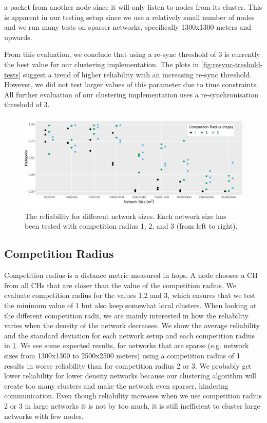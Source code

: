 a packet from another node since it will only listen to nodes from its cluster. This is apparent in our testing setup since we use a relatively small number of nodes and we run many tests on sparser networks, specifically 1300x1300 meters and upwards. 

From this evaluation, we conclude that using a re-sync threshold of 3 is currently the best value for our clustering implementation. The plots in \cref{fig:resync-treshold-tests} suggest a trend of higher reliability with an increasing re-sync threshold. However, we did not test larger values of this parameter due to time constraints. All further evaluation of our clustering implementation uses a re-synchronisation threshold of 3.

\begin{figure}[bt]
    \centering
    \includegraphics[width=\textwidth, keepaspectratio]{figure/Results/ParameterEvaluation/CompetitionRadius_Reliability.pdf}
    \caption{The reliability for different network sizes. Each network size has been tested with competition radius 1, 2, and 3 (from left to right).}
    \label{fig:comp-radius-reliability}
\end{figure}

\subsection{Competition Radius}
Competition radius is a distance metric measured in hops. A node chooses a CH from all CHs that are closer than the value of the competition radius. We evaluate competition radius for the values 1,2 and 3, which ensures that we test the minimum value of 1 but also keep somewhat local clusters. When looking at the different competition radii, we are mainly interested in how the reliability varies when the density of the network decreases. We show the average reliability and the standard deviation for each network setup and each competition radius in \cref{fig:comp-radius-reliability}. We see some expected results, for networks that are sparse (e.g. network sizes from 1300x1300 to 2500x2500 meters) using a competition radius of 1 results in worse reliability than for competition radius 2 or 3. We probably get lower reliability for lower density networks because our clustering algorithm will create too many clusters and make the network even sparser, hindering communication. Even though reliability increases when we use competition radius 2 or 3 in large networks it is not by too much, it is still inefficient to cluster large networks with few nodes. 

